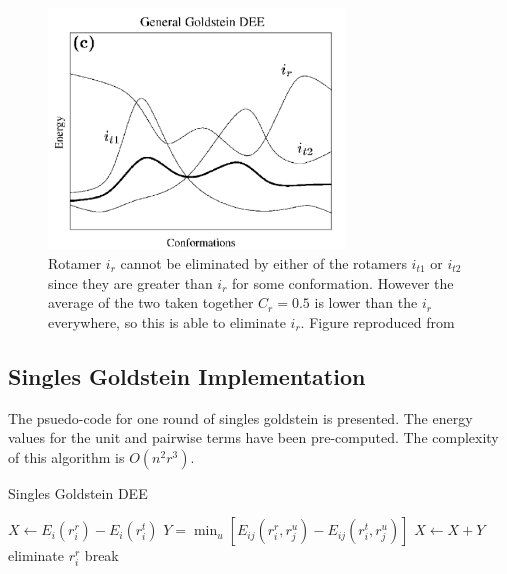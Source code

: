 \documentclass{article}
\begin{document}
\begin{figure}[h!]
    \centering
    \includegraphics[width=0.7\textwidth]{pics/goldgen.pdf}
    \caption{Rotamer $i_r$ cannot be eliminated by either of the rotamers $i_{t1}$ or $i_{t2}$ since they are greater than $i_r$ for some conformation. However the average of the two taken together $C_r=0.5$ is lower than the $i_r$ everywhere, so this is able to eliminate $i_r$.  Figure reproduced from~\cite{Pierce2000}}
    \label{fig:goldstein_gen}
\end{figure}

\pagebreak

\subsection{Singles Goldstein Implementation}
The psuedo-code for one round of singles goldstein is presented. The energy values for the unit and pairwise terms have been pre-computed. The complexity of this algorithm is $O(n^2r^3)$. 

\begin{algorithm}
\caption{Singles Goldstein DEE} \label{algo:goldstein}
\begin{algorithmic}
			\State $X \gets E_i(r_i^r) - E_i(r_i^t)$
					\State $Y = \min_u\left[E_{ij}(r_i^r,r_j^u) - E_{ij}(r_i^t,r_j^u) \right]$
				\EndFor
				\State $X \gets X + Y$
			\EndFor
				\State eliminate $r_i^r$
				\State break
			\EndIf
		\EndFor
	\EndFor
\EndFor
\end{algorithmic}
\end{algorithm}

\pagebreak
\end{document}
